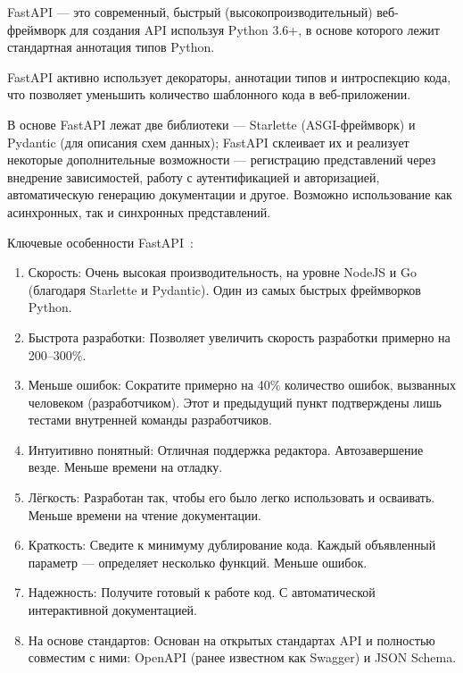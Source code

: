 \documentclass{altsu-report}
\begin{document}
FastAPI — это современный, быстрый (высокопроизводительный) веб-фреймворк для создания API используя Python 3.6+, в основе которого лежит стандартная аннотация типов Python.

FastAPI активно использует декораторы, аннотации типов и интроспекцию кода, что позволяет уменьшить количество шаблонного кода в веб-приложении.

В основе FastAPI лежат две библиотеки --- Starlette (ASGI-фреймворк) и Pydantic (для описания схем данных); FastAPI склеивает их и реализует некоторые дополнительные возможности --- регистрацию представлений через внедрение зависимостей, работу с аутентификацией и авторизацией, автоматическую генерацию документации и другое. Возможно использование как асинхронных, так и синхронных представлений.

Ключевые особенности FastAPI~\cite{FastAPI}:

\begin{enumerate}
    \item Скорость: Очень высокая производительность, на уровне NodeJS и Go (благодаря Starlette и Pydantic). Один из самых быстрых фреймворков Python.

    \item Быстрота разработки: Позволяет увеличить скорость разработки примерно на 200–300\%.

    \item Меньше ошибок: Сократите примерно на 40\% количество ошибок, вызванных человеком (разработчиком). Этот и предыдущий пункт подтверждены лишь тестами внутренней команды разработчиков.

    \item Интуитивно понятный: Отличная поддержка редактора. Автозавершение везде. Меньше времени на отладку.

    \item Лёгкость: Разработан так, чтобы его было легко использовать и осваивать. Меньше времени на чтение документации.

    \item Краткость: Сведите к минимуму дублирование кода. Каждый объявленный параметр --- определяет несколько функций. Меньше ошибок.

    \item Надежность: Получите готовый к работе код. С автоматической интерактивной документацией.

    \item На основе стандартов: Основан на открытых стандартах API и полностью совместим с ними: OpenAPI (ранее известном как Swagger) и JSON Schema.
\end{enumerate}
\end{document}
